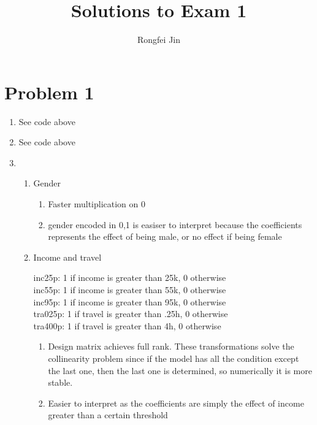 \documentclass{article}
\title{Solutions to Exam 1 }
\author{Rongfei Jin}
\begin{document}
\pagestyle{fancy}
\fancyhf{}%
\fancyfoot[C]{\thepage}%
\maketitle

\section*{Problem 1}


\begin{enumerate}[label=(\alph*)]
\item See code above
\item See code above
\item 
\begin{enumerate}[label=(\arabic*)]


    \item Gender
\begin{enumerate}[label=(\roman*)]
    \item Faster multiplication on 0
    \item
gender encoded in 0,1 is easiser to interpret because the coefficients represents the effect of being male, or no effect if being female
\end{enumerate}
\item Income and travel

inc25p: 1 if income is greater than 25k, 0 otherwise \\
inc55p: 1 if income is greater than 55k, 0 otherwise \\
inc95p: 1 if income is greater than 95k, 0 otherwise \\
tra025p: 1 if travel is greater than .25h, 0 otherwise \\
tra400p: 1 if travel is greater than 4h, 0 otherwise \\


\begin{enumerate}[label=(\roman*)]
    \item Design matrix achieves full rank.
These transformations solve the collinearity problem since if the model has all the condition except the last one, then the last one is determined, so numerically it is more stable. 

\item 
Easier to interpret as the coefficients are simply the effect of income greater than a certain threshold 

\end{enumerate}
\end{enumerate}


\end{enumerate}
\end{document}
